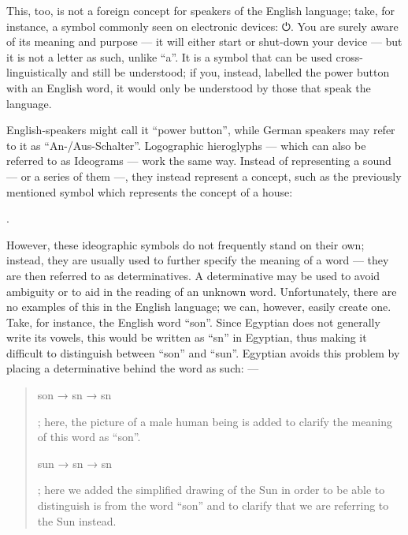 \documentclass[a5paper,twoside,11pt]{report}
\begin{document}
		This, too, is not a foreign concept for speakers of the English language; take, for instance, a symbol commonly seen on electronic devices: ⏻. You are surely aware of its meaning and purpose — it will either start or shut-down your device — but it is not a letter as such, unlike “a”. It is a symbol that can be used cross-linguistically and still be understood; if you, instead, labelled the power button with an English word, it would only be understood by those that speak the language.

		English-speakers might call it “power button”, while German speakers may refer to it as “An-/Aus-Schalter”. Logographic hieroglyphs — which can also be referred to as Ideograms — work the same way. Instead of representing a sound — or a series of them —, they instead represent a concept, such as the previously mentioned symbol which represents the concept of a house: \begin{hieroglyph}{\leavevmode {}}\end{hieroglyph}.

		However, these ideographic symbols do not frequently stand on their own; instead, they are usually used to further specify the meaning of a word — they are then referred to as determinatives. A determinative may be used to avoid ambiguity or to aid in the reading of an unknown word. Unfortunately, there are no examples of this in the English language; we can, however, easily create one. Take, for instance, the English word “son”. Since Egyptian does not generally write its vowels, this would be written as “sn” in Egyptian, thus making it difficult to distinguish between “son” and “sun”. Egyptian avoids this problem by placing a determinative behind the word as such: —

    \begin{quote}
      son → sn → sn\begin{hieroglyph}{\leavevmode {}}\end{hieroglyph}; here, the picture of a male human being is added to clarify the meaning of this word as “son”.

      sun → sn → sn\begin{hieroglyph}{\leavevmode {}}\end{hieroglyph}; here we added the simplified drawing of the Sun in order to be able to distinguish is from the word “son” and to clarify that we are referring to the Sun instead.
    \end{quote}
\end{document}
